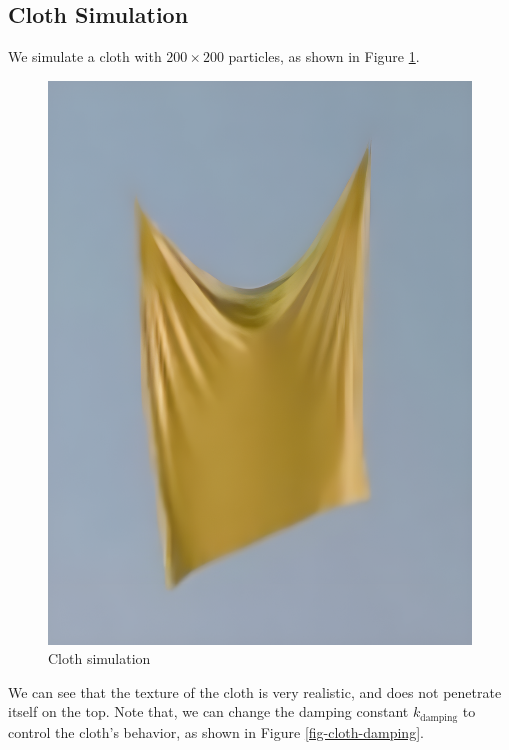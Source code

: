 \subsection{Cloth Simulation}

We simulate a cloth with $200\times 200$ particles, as shown in Figure \ref{fig-cloth}.

\begin{figure}[h]
  \centering
  \includegraphics[width=0.4\linewidth]{../project_demos/cloth.png}
  \caption{Cloth simulation}
  \label{fig-cloth}
\end{figure}

We can see that the texture of the cloth is very realistic, and does not penetrate itself on the top. Note that, we can change the damping constant $k_{\text{damping}}$ to control the cloth's behavior, as shown in Figure \ref{fig-cloth-damping}.

